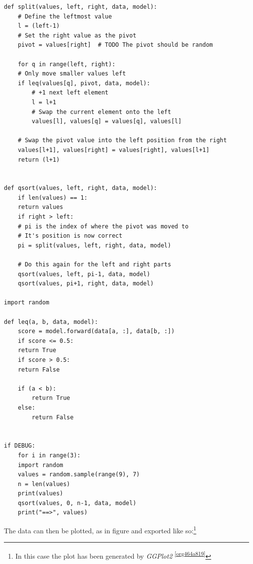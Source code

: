 \documentclass[a4paper,11pt,twoside]{article}
\begin{document}
\begin{verbatim}
def split(values, left, right, data, model):
    # Define the leftmost value
    l = (left-1)
    # Set the right value as the pivot
    pivot = values[right]  # TODO The pivot should be random

    for q in range(left, right):
	# Only move smaller values left
	if leq(values[q], pivot, data, model):
	    # +1 next left element
	    l = l+1
	    # Swap the current element onto the left
	    values[l], values[q] = values[q], values[l]

    # Swap the pivot value into the left position from the right
    values[l+1], values[right] = values[right], values[l+1]
    return (l+1)


def qsort(values, left, right, data, model):
    if len(values) == 1:
	return values
    if right > left:
	# pi is the index of where the pivot was moved to
	# It's position is now correct
	pi = split(values, left, right, data, model)

	# Do this again for the left and right parts
	qsort(values, left, pi-1, data, model)
	qsort(values, pi+1, right, data, model)

import random

def leq(a, b, data, model):
    score = model.forward(data[a, :], data[b, :])
    if score <= 0.5:
	return True
    if score > 0.5:
	return False

	if (a < b):
	    return True
	else:
	    return False


if DEBUG:
    for i in range(3):
	import random
	values = random.sample(range(9), 7)
	n = len(values)
	print(values)
	qsort(values, 0, n-1, data, model)
	print("==>", values)

\end{verbatim}

The data can then be plotted, as in figure and exported like so:\footnote{In this case the plot has been generated by \emph{GGPlot2} \textsuperscript{\ref{org464a819}}}
\end{document}
